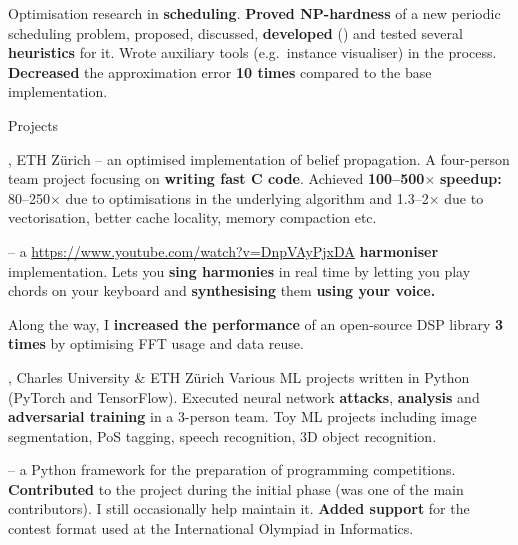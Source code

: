 %
%
\: Optimisation research in {\bf scheduling}.
\: {\bf Proved NP-hardness} of a new periodic scheduling problem, proposed, discussed, {\bf
developed} (\Cpp) and tested several {\bf heuristics} for it. Wrote auxiliary tools (e.g.~instance visualiser) in the process.
\:
{\bf Decreased} the approximation error {\bf 10 times} compared to the base implementation.

\endlist

\sekce Projects

, {\I ETH Zürich} – an optimised implementation of belief propagation.
\: A four-person team project focusing on {\bf writing fast C code}.
\: Achieved {\bf 100–500}$\times$ {\bf speedup:} 80–250$\times$ due to optimisations in the underlying algorithm and 1.3–2$\times$ due to vectorisation, better cache locality, memory compaction etc.
\endlist

 –
%
a \Cpp{} \url{https://www.youtube.com/watch?v=DnpVAyPjxDA}{{\bf
harmoniser}} implementation.
\: Lets you {\bf sing harmonies} in real time by letting you play chords on
your keyboard and {\bf synthesising} them {\bf using your voice.}

\: Along the way, I {\bf increased the performance} of an
open-source DSP library {\bf 3 times} by optimising FFT usage and data reuse.

\endlist

, {\I Charles University \& ETH Zürich}
%
\: Various ML projects written in Python (PyTorch and TensorFlow).
\: Executed neural network {\bf attacks}, {\bf analysis} and {\bf adversarial training} in a 3-person team.
\: Toy ML projects including image segmentation, PoS tagging, speech recognition, 3D object recognition.
\endlist

 – a Python framework for the preparation of programming competitions.
%
\: {\bf Contributed} to the project during the initial phase (was one of the main contributors). I still occasionally help maintain it.
\: {\bf Added support} for the contest format used at the International Olympiad in Informatics.
\endlist

